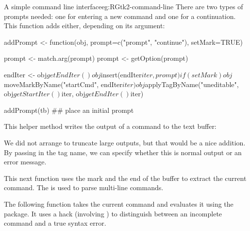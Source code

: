\begin{example}{A simple command line interface}{eg:RGtk2-command-line}
There are two types of prompts needed: one for entering a new command
and one for a continuation. This function adds either, depending on
its argument:
\begin{Schunk}
\begin{Sinput}
 addPrompt <- function(obj, prompt=c("prompt", "continue"),
                       setMark=TRUE) {
   prompt <- match.arg(prompt)
   prompt <- getOption(prompt)
   
   endIter <- obj$getEndIter()
   obj$insert(endIter$iter, prompt)
   if(setMark)
     obj$moveMarkByName("startCmd", endIter$iter)
   obj$applyTagByName("uneditable", obj$getStartIter()$iter, 
                      obj$getEndIter()$iter)
 }
 addPrompt(tb) ## place an initial prompt
\end{Sinput}
\end{Schunk}

This helper method writes the output of a command to the text
buffer:
\begin{Schunk}
\end{Schunk}
%
We did not arrange to truncate large outputs, but that would be a nice
addition. By passing in the tag name, we can specify whether this is
normal output or an error message.

This next function uses the  mark and the end of the buffer
to extract the current command. The  is used to parse multi-line commands.
\begin{Schunk}
\end{Schunk}
%

The following function takes the current command and evaluates it
using the  package. It uses a hack (involving
) to distinguish between an incomplete command and a true
syntax error.


\end{example}
